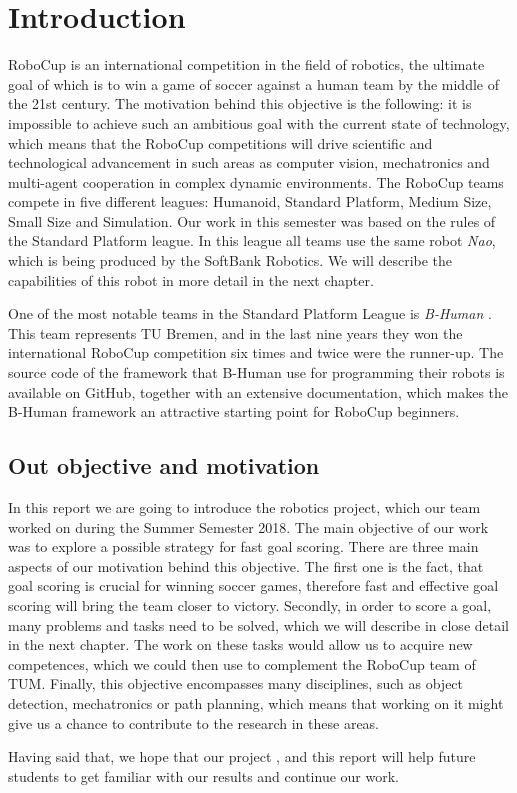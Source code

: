 \chapter{Introduction}

RoboCup \cite{robocup} is an international competition in the field of
robotics, the ultimate goal of which is to win a game of soccer against a human
team by the middle of the 21st century. The motivation behind this objective is
the following: it is impossible to achieve such an ambitious goal with the
current state of technology, which means that the RoboCup competitions will
drive scientific and technological advancement in such areas as computer
vision, mechatronics and multi-agent cooperation in complex dynamic
environments. The RoboCup teams compete in five different leagues: Humanoid,
Standard Platform, Medium Size, Small Size and Simulation. Our work in this
semester was based on the rules of the Standard Platform league. In this league
all teams use the same robot \textit{Nao}, which is being produced by the
SoftBank Robotics. We will describe the capabilities of this robot in more
detail in the next chapter.

One of the most notable teams in the Standard Platform League is
\textit{B-Human} \cite{bhuman}. This team represents TU Bremen, and in the last
nine years they won the international RoboCup competition six times and twice
were the runner-up. The source code of the framework that B-Human use for
programming their robots is available on GitHub, together with an extensive
documentation, which makes the B-Human framework an attractive starting point
for RoboCup beginners.

\section{Out objective and motivation}

In this report we are going to introduce the robotics project, which our team
worked on during the Summer Semester 2018. The main objective of our work was
to explore a possible strategy for fast goal scoring. There are three main
aspects of our motivation behind this objective. The first one is the fact,
that goal scoring is crucial for winning soccer games, therefore fast and
effective goal scoring will bring the team closer to victory. Secondly, in
order to score a goal, many problems and tasks need to be solved, which we will
describe in close detail in the next chapter. The work on these tasks would
allow us to acquire new competences, which we could then use to complement the
RoboCup team of TUM. Finally, this objective encompasses many disciplines, such
as object detection, mechatronics or path planning, which means that working on
it might give us a chance to contribute to the research in these areas.

Having said that, we hope that our project , and this report
will help future students to get familiar with our results and continue our
work.
